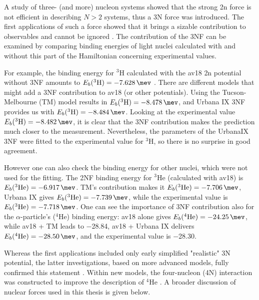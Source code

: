 A study of three- (and more) nucleon systems showed that
the strong \gls{2n} force is not efficient in describing
$N>2$ systems, thus a 3N force was introduced. The first applications of such
a force showed that it brings a
sizable contribution to observables and cannot be ignored \cite{GLOCKLE1982343}.
The contribution of the 3NF can be examined by
comparing binding energies of light nuclei calculated with
and without this part of the Hamiltonian concerning experimental values.

For example, the binding energy for $^3$H calculated with the \gls{av18} \gls{2n} potential 
without 3NF amounts to
$E_b(^3\mathrm{H}) = \SI{-7.628}{\mev}$ \cite{NoggaAV18}. There are different models that might add a 3NF
contribution to \gls{av18} (or other potentials). Using the Tucson-Melbourne (TM) model \cite{Tucson-Melbourne}
results in $E_b(^3\mathrm{H}) = \SI{-8.478}{\mev}$, and Urbana IX \cite{Urbana3NF} 3NF provides us with
$E_b(^3\mathrm{H}) = \SI{-8.484}{\mev}$. Looking at the experimental value $E_b(^3\mathrm{H}) = \SI{-8.482}{\mev}$,
it is clear that the 3NF contribution makes the prediction much closer to the measurement.
Nevertheless, the parameters of the UrbanaIX
3NF were fitted to the experimental value for $^3\mathrm{H}$, so there is no surprise in good agreement.

However one can also check the binding energy for other nuclei, which were not used for the fitting.
The 2NF binding energy for $^3$He
(calculated with \gls{av18}) is $E_b(^3\mathrm{He}) = \SI{-6.917}{\mev}$. TM's contribution makes it
$E_b(^3\mathrm{He}) = \SI{-7.706}{\mev}$, Urbana IX gives $E_b(^3\mathrm{He}) = \SI{-7.739}{\mev}$, while the
experimental value is $E_b(^3\mathrm{He}) = \SI{-7.718}{\mev}$. One can see the importance of 3NF
contribution also for the $\alpha$-particle's ($^4\mathrm{He}$) binding energy:
\gls{av18} alone gives
$E_b(^4\mathrm{He}) = \SI{-24.25}{\mev}$, while \gls{av18} + TM leads to \SI{-28.84}{\mev},
\gls{av18} + Urbana IX delivers $E_b(^4\mathrm{He}) = \SI{-28.50}{\mev}$,
and the experimental value is \SI{-28.30}{\mev}\cite{NoggaAV18}.

Whereas the first applications included only early simplified "realistic" 3N potential, the latter
investigations, based on more advanced models, fully confirmed this statement \cite{StoksPhysRevC49, AV18Wiringa}.
Within new models, the four-nucleon (4N) interaction was constructed to improve the description of
$^4\mathrm{He}$ \cite{NoggaPhysRevLett}.
A broader discussion of nuclear forces used in this thesis is given below.

